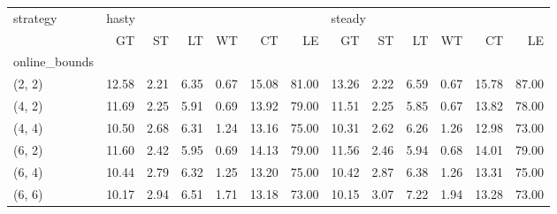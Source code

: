 \begin{tabular}{lrrrrrrrrrrrr}
\toprule
strategy & \multicolumn{6}{l}{hasty} & \multicolumn{6}{l}{steady} \\
{} &    GT &   ST &   LT &   WT &    CT &    LE &     GT &   ST &   LT &   WT &    CT &    LE \\
online\_bounds &       &      &      &      &       &       &        &      &      &      &       &       \\
\midrule
(2, 2)        & 12.58 & 2.21 & 6.35 & 0.67 & 15.08 & 81.00 &  13.26 & 2.22 & 6.59 & 0.67 & 15.78 & 87.00 \\
(4, 2)        & 11.69 & 2.25 & 5.91 & 0.69 & 13.92 & 79.00 &  11.51 & 2.25 & 5.85 & 0.67 & 13.82 & 78.00 \\
(4, 4)        & 10.50 & 2.68 & 6.31 & 1.24 & 13.16 & 75.00 &  10.31 & 2.62 & 6.26 & 1.26 & 12.98 & 73.00 \\
(6, 2)        & 11.60 & 2.42 & 5.95 & 0.69 & 14.13 & 79.00 &  11.56 & 2.46 & 5.94 & 0.68 & 14.01 & 79.00 \\
(6, 4)        & 10.44 & 2.79 & 6.32 & 1.25 & 13.20 & 75.00 &  10.42 & 2.87 & 6.38 & 1.26 & 13.31 & 75.00 \\
(6, 6)        & 10.17 & 2.94 & 6.51 & 1.71 & 13.18 & 73.00 &  10.15 & 3.07 & 7.22 & 1.94 & 13.28 & 73.00 \\
\bottomrule
\end{tabular}
